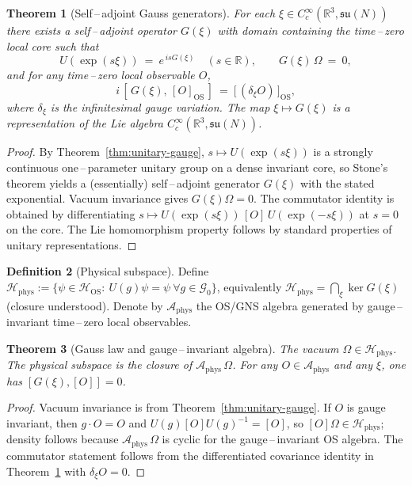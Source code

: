 \documentclass[11pt]{amsart}
\theoremstyle{plain}
\newtheorem{theorem}{Theorem}[section]
\theoremstyle{definition}
\newtheorem{definition}[theorem]{Definition}
\theoremstyle{remark}
\begin{document}
\begin{theorem}[Self\,–\,adjoint Gauss generators]\label{thm:gauss-generators}
For each $\xi\in C_c^\infty(\mathbb R^3,\mathfrak{su}(N))$ there exists a self\,–\,adjoint operator $G(\xi)$ with domain containing the time\,–\,zero local core such that
\[
  U(\exp(s\xi))\ =\ e^{\,i s G(\xi)}\quad (s\in\mathbb R),\qquad G(\xi)\,\Omega\ =\ 0,
\]
and for any time\,–\,zero local observable $O$,
\[
  i\,[\,G(\xi),\,[O]_{\mathrm{OS}}\,]\ =\ \big[\,(\delta_\xi O)\,\big]_{\mathrm{OS}},
\]
where $\delta_\xi$ is the infinitesimal gauge variation. The map $\xi\mapsto G(\xi)$ is a representation of the Lie algebra $C_c^\infty(\mathbb R^3,\mathfrak{su}(N))$.
\end{theorem}
\begin{proof}
By Theorem~\ref{thm:unitary-gauge}, $s\mapsto U(\exp(s\xi))$ is a strongly continuous one\,–\,parameter unitary group on a dense invariant core, so Stone's theorem yields a (essentially) self\,–\,adjoint generator $G(\xi)$ with the stated exponential. Vacuum invariance gives $G(\xi)\Omega=0$. The commutator identity is obtained by differentiating $s\mapsto U(\exp(s\xi))\,[O]\,U(\exp(-s\xi))$ at $s=0$ on the core. The Lie homomorphism property follows by standard properties of unitary representations.
\end{proof}
\begin{definition}[Physical subspace]
Define $\mathcal H_{\mathrm{phys}}:=\{\psi\in\mathcal H_{\mathrm{OS}}:\ U(g)\psi=\psi\ \forall g\in\mathcal G_0\}$, equivalently $\mathcal H_{\mathrm{phys}}=\bigcap_{\xi} \ker G(\xi)$ (closure understood). Denote by $\mathcal A_{\mathrm{phys}}$ the OS/GNS algebra generated by gauge\,–\,invariant time\,–\,zero local observables.
\end{definition}

\begin{theorem}[Gauss law and gauge\,–\,invariant algebra]\label{prop:gauss-phys}
The vacuum $\Omega\in\mathcal H_{\mathrm{phys}}$. The physical subspace is the closure of $\mathcal A_{\mathrm{phys}}\,\Omega$. For any $O\in\mathcal A_{\mathrm{phys}}$ and any $\xi$, one has $[G(\xi),[O]]=0$.
\end{theorem}
\begin{proof}
Vacuum invariance is from Theorem~\ref{thm:unitary-gauge}. If $O$ is gauge invariant, then $g\cdot O=O$ and $U(g)[O]U(g)^{-1}=[O]$, so $[O]\Omega\in\mathcal H_{\mathrm{phys}}$; density follows because $\mathcal A_{\mathrm{phys}}\,\Omega$ is cyclic for the gauge\,–\,invariant OS algebra. The commutator statement follows from the differentiated covariance identity in Theorem~\ref{thm:gauss-generators} with $\delta_\xi O=0$.
\end{proof}
\end{document}
